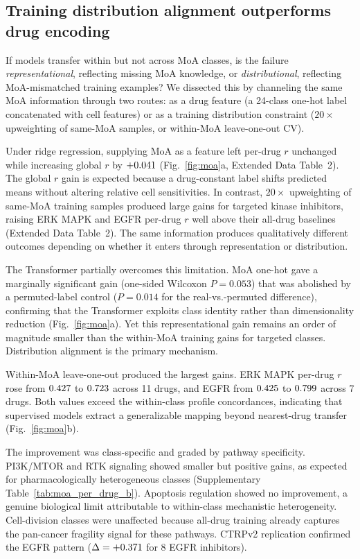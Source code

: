 \subsection*{Training distribution alignment outperforms drug encoding}

If models transfer within but not across MoA classes\cite{herbert2026monotherapy}, is the failure \emph{representational}, reflecting missing MoA knowledge, or \emph{distributional}, reflecting MoA-mismatched training examples? We dissected this by channeling the same MoA information through two routes: as a drug feature (a 24-class one-hot label concatenated with cell features) or as a training distribution constraint ($20\times$ upweighting of same-MoA samples, or within-MoA leave-one-out CV).

Under ridge regression, supplying MoA as a feature left per-drug $r$ unchanged while increasing global $r$ by $+0.041$ (Fig.~\ref{fig:moa}a, Extended Data Table~2). The global $r$ gain is expected because a drug-constant label shifts predicted means without altering relative cell sensitivities. In contrast, $20\times$ upweighting of same-MoA training samples produced large gains for targeted kinase inhibitors, raising ERK MAPK and EGFR per-drug $r$ well above their all-drug baselines (Extended Data Table~2). The same information produces qualitatively different outcomes depending on whether it enters through representation or distribution.

The Transformer partially overcomes this limitation. MoA one-hot gave a marginally significant gain (one-sided Wilcoxon $P = 0.053$) that was abolished by a permuted-label control ($P = 0.014$ for the real-vs.-permuted difference), confirming that the Transformer exploits class identity rather than dimensionality reduction (Fig.~\ref{fig:moa}a). Yet this representational gain remains an order of magnitude smaller than the within-MoA training gains for targeted classes. Distribution alignment is the primary mechanism.

Within-MoA leave-one-out produced the largest gains. ERK MAPK per-drug $r$ rose from $0.427$ to $0.723$ across 11 drugs, and EGFR from $0.425$ to $0.799$ across 7 drugs. Both values exceed the within-class profile concordances, indicating that supervised models extract a generalizable mapping beyond nearest-drug transfer (Fig.~\ref{fig:moa}b).

The improvement was class-specific and graded by pathway specificity. PI3K/MTOR and RTK signaling showed smaller but positive gains, as expected for pharmacologically heterogeneous classes (Supplementary Table~\ref{tab:moa_per_drug_b}). Apoptosis regulation showed no improvement, a genuine biological limit attributable to within-class mechanistic heterogeneity. Cell-division classes were unaffected because all-drug training already captures the pan-cancer fragility signal for these pathways. CTRPv2 replication confirmed the EGFR pattern ($\Delta = +0.371$ for 8 EGFR inhibitors).

